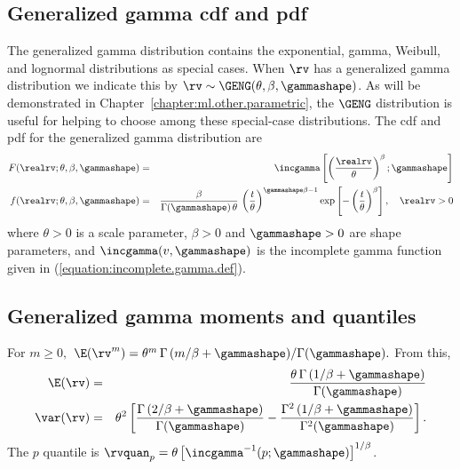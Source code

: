 \subsection{Generalized gamma cdf and pdf}
The generalized gamma distribution 
contains the exponential, gamma, Weibull, and lognormal distributions
as special cases. When $\rv$ has a generalized gamma distribution
we indicate this by $\rv \sim \GENG(\theta,\beta,\gammashape)$. As will
be demonstrated in Chapter~\ref{chapter:ml.other.parametric}, 
the $\GENG$ distribution is useful for
helping to choose among  these special-case distributions. 
The cdf and pdf for the generalized gamma distribution are
\begin{eqnarray}  
\label{equation:gng.cdf}  
 F(\realrv;\theta,\beta,\gammashape)&=&\incgamma
	\left [
	\left (
          \frac{\realrv}{\theta}
	\right)^{\beta};  \gammashape
	\right ] \\
 f(\realrv;\theta,\beta,\gammashape)&=&
 \frac{\beta}{ \Gamma(\gammashape)\,\theta} \,
          \left (
          \frac{t}{\theta}
          \right )^{\gammashape\beta-1}
          \exp \left [ -
	   \left (
          \frac{t}{\theta}
          \right )^{\beta}    
               \right ] \nonumber , \quad \realrv > 0
\end{eqnarray} 
where $\theta>0$ is a scale
parameter, $\beta>0$ and $\gammashape>0$ are shape parameters,
and $\incgamma(v,\gammashape)$ is the incomplete gamma 
function given in (\ref{equation:incomplete.gamma.def}).

\subsection{Generalized gamma moments and quantiles}
\label{section:gng.moment.quant}
For $m \geq 0,$ $\E(\rv^{m})=   {\theta^{m} \, \Gamma\left(
m/\beta + \gammashape 			 \right) 	 }
/ 		 { 		 \Gamma(\gammashape) 		 }.  $
From this,
\begin{eqnarray*}
	\E(\rv)&=& 
	     \frac{\theta \, \Gamma\left(
			1/\beta + \gammashape 
			 \right)
	          }
		  {
		   \Gamma(\gammashape)
		  }
\\
	\var(\rv)&=& \theta^{2} 		 \left [
\frac{\Gamma\left( 			2/\beta + \gammashape
\right) 	 } 		 { 		 \Gamma(\gammashape)
} -
\frac{\Gamma^{2}\left(
			1/\beta + \gammashape 
			 \right)
	          }
		  {
		   \Gamma^{2}(\gammashape)
		  }
		   \right ] .
\end{eqnarray*}
The $p$ quantile is
$\rvquan_{p}=\theta \left[ \incgamma^{-1}(p;\gammashape) \right ]^{1/\beta}$.

